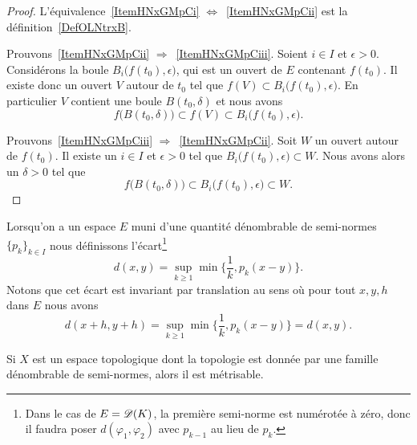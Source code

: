 \begin{proof}
    L'équivalence~\ref{ItemHNxGMpCi} \( \Leftrightarrow\)~\ref{ItemHNxGMpCii} est la définition~\ref{DefOLNtrxB}.

    Prouvons~\ref{ItemHNxGMpCii} \( \Rightarrow\)~\ref{ItemHNxGMpCiii}. Soient \( i\in I\) et \( \epsilon>0\). Considérons la boule \( B_i\big( f(t_0),\epsilon \big)\), qui est un ouvert de \( E\) contenant \( f(t_0)\). Il existe donc un ouvert \( V\) autour de \( t_0\) tel que \( f(V)\subset B_i\big( f(t_0),\epsilon \big)\). En particulier \( V\) contient une boule \( B(t_0,\delta)\) et nous avons
    \begin{equation}
        f\big( B(t_0,\delta) \big)\subset f(V)\subset B_i\big( f(t_0),\epsilon \big).
    \end{equation}

    Prouvons~\ref{ItemHNxGMpCiii} \( \Rightarrow\)~\ref{ItemHNxGMpCii}. Soit \( W\) un ouvert autour de \( f(t_0)\). Il existe un \( i\in I\) et \( \epsilon>0\) tel que \( B_i\big( f(t_0),\epsilon \big)\subset W\). Nous avons alors un \( \delta>0\) tel que
    \begin{equation}
        f\big( B(t_0,\delta) \big)\subset B_i\big( f(t_0),\epsilon \big)\subset W.
    \end{equation}
\end{proof}

Lorsqu'on a un espace \( E\) muni d'une quantité dénombrable de semi-normes \( \{ p_k \}_{k\in I}\) nous définissons l'écart\footnote{Dans le cas de \( E=\mathscr{D}(K)\), la première semi-norme est numérotée à zéro, donc il faudra poser \( d(\varphi_1,\varphi_2)\) avec \( p_{k-1}\) au lieu de \( p_k\).}
\begin{equation}        \label{EqAAghiUR}
    d(x,y)=\sup_{k\geq 1}\min\big\{  \frac{1}{ k },p_k(x-y) \big\}.
\end{equation}
Notons que cet écart est invariant par translation au sens où pour tout \( x,y,h\) dans \( E\) nous avons
\begin{equation}
    d(x+h,y+h)=\sup_{k\geq 1}\min\big\{ \frac{1}{ k },p_k(x-y) \big\}=d(x,y).
\end{equation}


\begin{proposition}     \label{PROPooMJEQooHtIyeX}
    Si \( X\) est un espace topologique dont la topologie est donnée par une famille dénombrable de semi-normes, alors il est métrisable.
\end{proposition}

